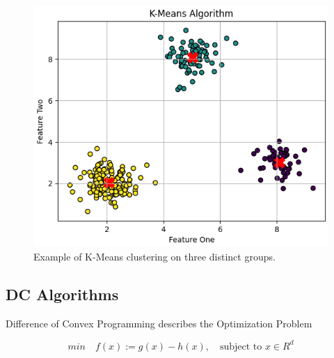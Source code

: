 \begin{figure}[!htpb]
    \centering
    \includegraphics[width=\linewidth]{Figures/K-Means.png}
    \caption{Example of K-Means clustering on three distinct groups.}
    \label{fig:kmeans}
\end{figure}




\subsection{DC Algorithms}
Difference of Convex Programming describes the Optimization Problem

\begin{equation}
    min \quad f(x) := g(x) - h(x), \quad \text{subject to } x \in R^d
    \label{dc function}
\end{equation}

